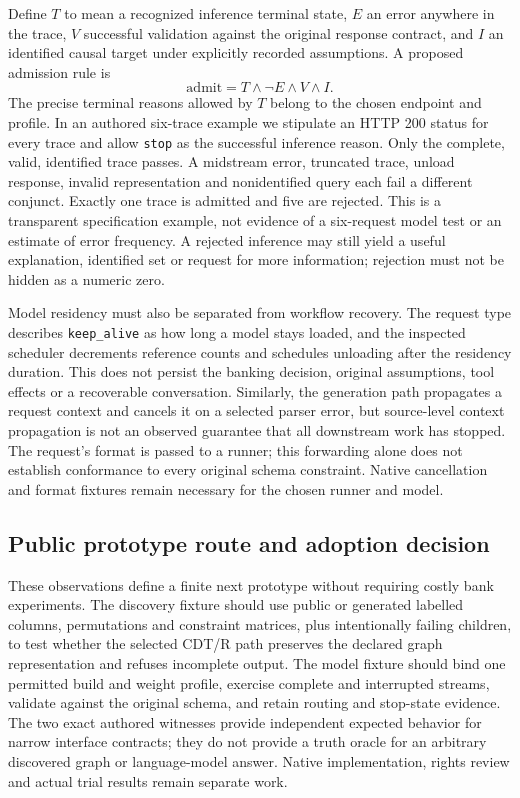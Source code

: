 Define $T$ to mean a recognized inference terminal state, $E$ an error anywhere in the trace,
$V$ successful validation against the original response contract, and $I$ an identified causal
target under explicitly recorded assumptions. A proposed admission rule is
\[
 \mathrm{admit}=T\land\neg E\land V\land I.
\]
The precise terminal reasons allowed by $T$ belong to the chosen endpoint and profile.
In an authored six-trace example we stipulate an HTTP 200 status for every trace and allow
\texttt{stop} as the successful inference reason. Only the complete, valid, identified trace
passes. A midstream error, truncated trace, unload response, invalid representation and
nonidentified query each fail a different conjunct. Exactly one trace is admitted and five are
rejected. This is a transparent specification example, not evidence of a six-request model test
or an estimate of error frequency. A rejected inference may still yield a useful explanation,
identified set or request for more information; rejection must not be hidden as a numeric zero.
\citep{exec28_bp_reference}

Model residency must also be separated from workflow recovery. The request type describes
\texttt{keep\_alive} as how long a model stays loaded, and the inspected scheduler decrements
reference counts and schedules unloading after the residency duration. This does not persist
the banking decision, original assumptions, tool effects or a recoverable conversation.
Similarly, the generation path propagates a request context and cancels it on a selected parser
error, but source-level context propagation is not an observed guarantee that all downstream
work has stopped. The request's format is passed to a runner; this forwarding alone does not
establish conformance to every original schema constraint. Native cancellation and format
fixtures remain necessary for the chosen runner and model.\citep{exec28_bp_ollama}

\subsection{Public prototype route and adoption decision}
These observations define a finite next prototype without requiring costly bank experiments.
The discovery fixture should use public or generated labelled columns, permutations and
constraint matrices, plus intentionally failing children, to test whether the selected CDT/R
path preserves the declared graph representation and refuses incomplete output. The model
fixture should bind one permitted build and weight profile, exercise complete and interrupted
streams, validate against the original schema, and retain routing and stop-state evidence.
The two exact authored witnesses provide independent expected behavior for narrow interface
contracts; they do not provide a truth oracle for an arbitrary discovered graph or language-model
answer. Native implementation, rights review and actual trial results remain separate work.

